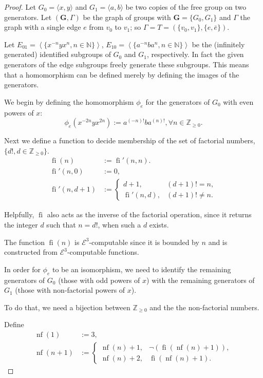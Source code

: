\documentclass[a4paper]{article}
\newcommand{\grz}[1]{$\mathcal{E}^{#1}$}	%
\newcommand{\ZZ}{\mathbb{Z}}
\newcommand{\recur}[1]{\begin{equation} \begin{split} #1 \end{split} \end{equation}}	%
\theoremstyle{plain}
\theoremstyle{definition}
\begin{document}
\begin{proof}
Let $G_0 = \langle x,y \rangle$ and $G_1 = \langle a,b \rangle$  
be two copies of the free group on two generators. Let $(\mathbf{G},\Gamma)$
 be the graph of groups with $\mathbf{G} = \{G_0,G_1\}$ and $\Gamma$ the 
graph
with a single edge $e$ from $v_0$ to $v_1$; so $\Gamma = T = (\{v_0,v_1\},\{e,\bar{e}\})$.

Let $E_{01} = \left \langle \{x^{-n}yx^n, n \in \mathbb{N} \} \right \rangle$, $E_{10} = \left\langle \{ a^{-n}ba^n, n \in \mathbb{N} \} \right\rangle$ be the (infinitely generated) identified subgroups of $G_0$ and $G_1$, respectively. In fact the given generators of the edge subgroups freely generate
these subgroups. This means that a homomorphism can be defined merely
by defining the images of the generators.

We begin by defining the homomorphism $\phi_e$ for the generators of $G_0$ with even powers of $x$:
\[	\phi_{e}(x^{-2n}yx^{2n}) := a^{(-n)!}ba^{(n)!}, \forall n \in \ZZ_{\geq 0}. \]

Next we define a function to decide membership of the set of factorial numbers, $\{d!, d \in \ZZ_{\geq 0}\}$. \recur{
\operatorname{fi}(n) &:= \operatorname{fi}'(n,n).\\
\operatorname{fi}'(n,0) &:= 0, \\
\operatorname{fi}'(n,d+1) &:= 
	\begin{cases} 
		d+1, & (d+1)! = n, \\
		\operatorname{fi}'(n,d), & (d+1)! \neq n.
	\end{cases}
}

Helpfully, $\operatorname{fi}$ also acts as the inverse of the factorial operation, since it returns the integer $d$ such that $n = d!$, when such a $d$ exists.

The function $\operatorname{fi}(n)$ is \grz{3}-computable since it is bounded by $n$ and is constructed from \grz{3}-computable functions.

In order for $\phi_e$ to be an isomorphism, we need to identify the remaining generators of $G_0$ (those with odd powers of $x$) with the remaining generators of $G_1$ (those with non-factorial powers of $x$).

To do that, we need a bijection between $\ZZ_{\geq 0}$ and the the non-factorial numbers.

Define 
\recur{
	\operatorname{nf}(1) &:= 3, \\
	\operatorname{nf}(n+1) &:= 
		\begin{cases}
			\operatorname{nf}(n)+1, & \neg(\operatorname{fi}(\operatorname{nf}(n)+1)), \\
			\operatorname{nf}(n)+2, & \operatorname{fi}(\operatorname{nf}(n)+1).
		\end{cases}
}


\end{proof}
\end{document}
